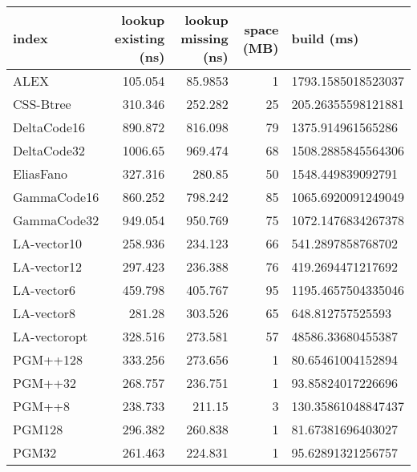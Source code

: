 \begin{tabular}{lrrrl}
\hline
 index             &   lookup existing (ns) &   lookup missing (ns) &   space (MB) & build (ms)         \\
\hline
 ALEX              &               105.054  &               85.9853 &            1 & 1793.1585018523037 \\
 CSS-Btree         &               310.346  &              252.282  &           25 & 205.26355598121881 \\
 DeltaCode16       &               890.872  &              816.098  &           79 & 1375.914961565286  \\
 DeltaCode32       &              1006.65   &              969.474  &           68 & 1508.2885845564306 \\
 EliasFano         &               327.316  &              280.85   &           50 & 1548.449839092791  \\
 GammaCode16       &               860.252  &              798.242  &           85 & 1065.6920091249049 \\
 GammaCode32       &               949.054  &              950.769  &           75 & 1072.1476834267378 \\
 LA-vector10       &               258.936  &              234.123  &           66 & 541.2897858768702  \\
 LA-vector12       &               297.423  &              236.388  &           76 & 419.2694471217692  \\
 LA-vector6        &               459.798  &              405.767  &           95 & 1195.4657504335046 \\
 LA-vector8        &               281.28   &              303.526  &           65 & 648.812757525593   \\
 LA-vectoropt      &               328.516  &              273.581  &           57 & 48586.33680455387  \\
 PGM++128          &               333.256  &              273.656  &            1 & 80.65461004152894  \\
 PGM++32           &               268.757  &              236.751  &            1 & 93.85824017226696  \\
 PGM++8            &               238.733  &              211.15   &            3 & 130.35861048847437 \\
 PGM128            &               296.382  &              260.838  &            1 & 81.67381696403027  \\
 PGM32             &               261.463  &              224.831  &            1 & 95.62891321256757  \\

\end{tabular}
